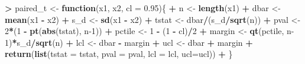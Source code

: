 \documentclass[
]{krantz}
\makeatletter
\newenvironment{Shaded}{\begin{snugshade}}{\end{snugshade}}
\newcommand{\ControlFlowTok}[1]{\textcolor[rgb]{0.27,0.27,0.27}{\textbf{#1}}}
\newcommand{\DataTypeTok}[1]{\textcolor[rgb]{0.27,0.27,0.27}{#1}}
\newcommand{\DecValTok}[1]{\textcolor[rgb]{0.06,0.06,0.06}{#1}}
\newcommand{\FloatTok}[1]{\textcolor[rgb]{0.06,0.06,0.06}{#1}}
\newcommand{\KeywordTok}[1]{\textcolor[rgb]{0.27,0.27,0.27}{\textbf{#1}}}
\newcommand{\NormalTok}[1]{#1}
\newcommand{\OperatorTok}[1]{\textcolor[rgb]{0.43,0.43,0.43}{\textbf{#1}}}
\newcommand{\StringTok}[1]{\textcolor[rgb]{0.5,0.5,0.5}{#1}}
\newenvironment{kframe}{%
\medskip{}
\setlength{\fboxsep}{.8em}
 \def\at@end@of@kframe{}%
 \ifinner\ifhmode%
  \def\at@end@of@kframe{\end{minipage}}%
  \begin{minipage}{\columnwidth}%
 \fi\fi%
 \def\FrameCommand##1{\hskip\@totalleftmargin \hskip-\fboxsep
 \colorbox{shadecolor}{##1}\hskip-\fboxsep
     \hskip-\linewidth \hskip-\@totalleftmargin \hskip\columnwidth}%
 \MakeFramed {\advance\hsize-\width
   \@totalleftmargin\z@ \linewidth\hsize
   \@setminipage}}%
 {\par\unskip\endMakeFramed%
 \at@end@of@kframe}
\renewenvironment{Shaded}{\begin{kframe}}{\end{kframe}}
\makeatother
\begin{document}
\begin{Shaded}
\begin{Highlighting}[]
\OperatorTok{\textgreater{}}\StringTok{ }\NormalTok{paired\_t \textless{}{-}}\StringTok{ }\ControlFlowTok{function}\NormalTok{(x1, x2, }\DataTypeTok{cl =} \FloatTok{0.95}\NormalTok{)\{}
\OperatorTok{+}\StringTok{     }\NormalTok{n \textless{}{-}}\StringTok{ }\KeywordTok{length}\NormalTok{(x1)}
\OperatorTok{+}\StringTok{     }\NormalTok{dbar \textless{}{-}}\StringTok{ }\KeywordTok{mean}\NormalTok{(x1 }\OperatorTok{{-}}\StringTok{ }\NormalTok{x2)}
\OperatorTok{+}\StringTok{     }\NormalTok{s\_d \textless{}{-}}\StringTok{ }\KeywordTok{sd}\NormalTok{(x1 }\OperatorTok{{-}}\StringTok{ }\NormalTok{x2)}
\OperatorTok{+}\StringTok{     }\NormalTok{tstat \textless{}{-}}\StringTok{ }\NormalTok{dbar}\OperatorTok{/}\NormalTok{(s\_d}\OperatorTok{/}\KeywordTok{sqrt}\NormalTok{(n))}
\OperatorTok{+}\StringTok{     }\NormalTok{pval \textless{}{-}}\StringTok{ }\DecValTok{2}\OperatorTok{*}\NormalTok{(}\DecValTok{1} \OperatorTok{{-}}\StringTok{ }\KeywordTok{pt}\NormalTok{(}\KeywordTok{abs}\NormalTok{(tstat), n}\DecValTok{{-}1}\NormalTok{))}
\OperatorTok{+}\StringTok{     }\NormalTok{pctile \textless{}{-}}\StringTok{ }\DecValTok{1} \OperatorTok{{-}}\StringTok{ }\NormalTok{(}\DecValTok{1} \OperatorTok{{-}}\StringTok{ }\NormalTok{cl)}\OperatorTok{/}\DecValTok{2}
\OperatorTok{+}\StringTok{     }\NormalTok{margin \textless{}{-}}\StringTok{ }\KeywordTok{qt}\NormalTok{(pctile, n}\DecValTok{{-}1}\NormalTok{)}\OperatorTok{*}\NormalTok{s\_d}\OperatorTok{/}\KeywordTok{sqrt}\NormalTok{(n)}
\OperatorTok{+}\StringTok{     }\NormalTok{lcl \textless{}{-}}\StringTok{ }\NormalTok{dbar }\OperatorTok{{-}}\StringTok{ }\NormalTok{margin}
\OperatorTok{+}\StringTok{     }\NormalTok{ucl \textless{}{-}}\StringTok{ }\NormalTok{dbar }\OperatorTok{+}\StringTok{ }\NormalTok{margin}
\OperatorTok{+}\StringTok{     }\KeywordTok{return}\NormalTok{(}\KeywordTok{list}\NormalTok{(}\DataTypeTok{tstat =}\NormalTok{ tstat, }\DataTypeTok{pval =}\NormalTok{ pval, }\DataTypeTok{lcl =}\NormalTok{ lcl, }\DataTypeTok{ucl=}\NormalTok{ucl))}
\OperatorTok{+}\StringTok{ }\NormalTok{\}}
\end{Highlighting}
\end{Shaded}

\begin{Shaded}
\end{Shaded}
\end{document}
